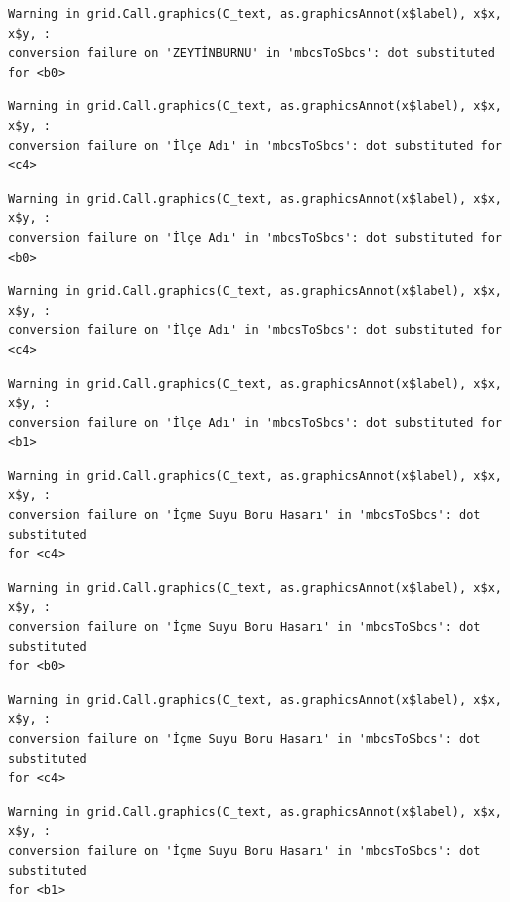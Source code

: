 \documentclass[
  11pt,
  a4paper,
  DIV=11,
  numbers=noendperiod]{scrartcl}
\begin{document}
\begin{verbatim}
Warning in grid.Call.graphics(C_text, as.graphicsAnnot(x$label), x$x, x$y, :
conversion failure on 'ZEYTİNBURNU' in 'mbcsToSbcs': dot substituted for <b0>
\end{verbatim}

\begin{verbatim}
Warning in grid.Call.graphics(C_text, as.graphicsAnnot(x$label), x$x, x$y, :
conversion failure on 'İlçe Adı' in 'mbcsToSbcs': dot substituted for <c4>
\end{verbatim}

\begin{verbatim}
Warning in grid.Call.graphics(C_text, as.graphicsAnnot(x$label), x$x, x$y, :
conversion failure on 'İlçe Adı' in 'mbcsToSbcs': dot substituted for <b0>
\end{verbatim}

\begin{verbatim}
Warning in grid.Call.graphics(C_text, as.graphicsAnnot(x$label), x$x, x$y, :
conversion failure on 'İlçe Adı' in 'mbcsToSbcs': dot substituted for <c4>
\end{verbatim}

\begin{verbatim}
Warning in grid.Call.graphics(C_text, as.graphicsAnnot(x$label), x$x, x$y, :
conversion failure on 'İlçe Adı' in 'mbcsToSbcs': dot substituted for <b1>
\end{verbatim}

\begin{verbatim}
Warning in grid.Call.graphics(C_text, as.graphicsAnnot(x$label), x$x, x$y, :
conversion failure on 'İçme Suyu Boru Hasarı' in 'mbcsToSbcs': dot substituted
for <c4>
\end{verbatim}

\begin{verbatim}
Warning in grid.Call.graphics(C_text, as.graphicsAnnot(x$label), x$x, x$y, :
conversion failure on 'İçme Suyu Boru Hasarı' in 'mbcsToSbcs': dot substituted
for <b0>
\end{verbatim}

\begin{verbatim}
Warning in grid.Call.graphics(C_text, as.graphicsAnnot(x$label), x$x, x$y, :
conversion failure on 'İçme Suyu Boru Hasarı' in 'mbcsToSbcs': dot substituted
for <c4>
\end{verbatim}

\begin{verbatim}
Warning in grid.Call.graphics(C_text, as.graphicsAnnot(x$label), x$x, x$y, :
conversion failure on 'İçme Suyu Boru Hasarı' in 'mbcsToSbcs': dot substituted
for <b1>
\end{verbatim}
\end{document}
